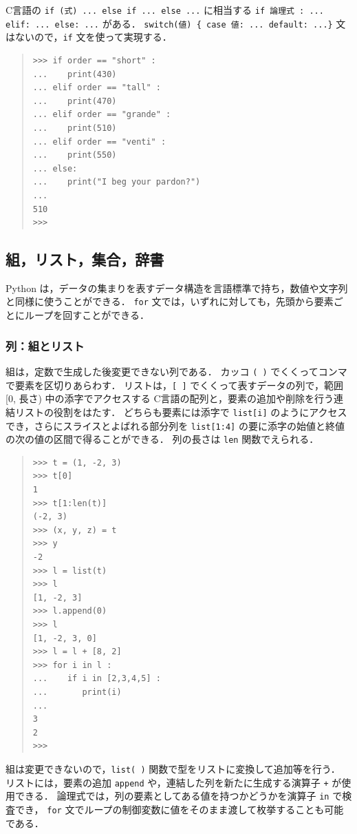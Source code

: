 \documentclass[11pt,a4,epsf]{article}
\begin{document}
C言語の \verb+if (式) ... else if ... else ...+ に相当する \verb+if 論理式 : ... elif: ... else: ...+ がある．
\verb+switch(値) { case 値: ... default: ...}+ 文はないので，\verb+if+ 文を使って実現する．
\begin{quote}
\small
\begin{verbatim}
>>> if order == "short" :
...    print(430)
... elif order == "tall" :
...    print(470)
... elif order == "grande" :
...    print(510)
... elif order == "venti" :
...    print(550)
... else:
...    print("I beg your pardon?")
...
510
>>>
\end{verbatim}
\end{quote}

\subsection{組，リスト，集合，辞書}

Python は，データの集まりを表すデータ構造を言語標準で持ち，数値や文字列と同様に使うことができる．
\verb+for+ 文では，いずれに対しても，先頭から要素ごとにループを回すことができる．

\subsubsection{列：組とリスト}
組は，定数で生成した後変更できない列である．
カッコ \verb+( )+ でくくってコンマで要素を区切りあらわす．
リストは，\verb+[ ]+ でくくって表すデータの列で，範囲 [0, 長さ) 中の添字でアクセスする C言語の配列と，要素の追加や削除を行う連結リストの役割をはたす．
どちらも要素には添字で \verb+list[i]+ のようにアクセスでき，さらにスライスとよばれる部分列を \verb+list[1:4]+ の要に添字の始値と終値の次の値の区間で得ることができる．
列の長さは \verb+len+ 関数でえられる．
\begin{quote}
\small
\begin{verbatim}
>>> t = (1, -2, 3)
>>> t[0]
1
>>> t[1:len(t)]
(-2, 3)
>>> (x, y, z) = t
>>> y
-2
>>> l = list(t)
>>> l
[1, -2, 3]
>>> l.append(0)
>>> l
[1, -2, 3, 0]
>>> l = l + [8, 2]
>>> for i in l :
...    if i in [2,3,4,5] :
...       print(i)
...
3
2
>>>
\end{verbatim}
\end{quote}
組は変更できないので，\verb+list( )+ 関数で型をリストに変換して追加等を行う．
リストには，要素の追加 \verb+append+ や，連結した列を新たに生成する演算子 \verb$+$ が使用できる．
論理式では，列の要素としてある値を持つかどうかを演算子 \verb+in+ で検査でき，
\verb+for+ 文でループの制御変数に値をそのまま渡して枚挙することも可能である．
\end{document}
